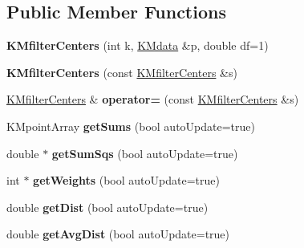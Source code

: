 \subsection*{Public Member Functions}
\begin{DoxyCompactItemize}
\item 
\hypertarget{class_k_mfilter_centers_af4430cb3cbc82ee0c08f837748f59bdb}{
{\bfseries KMfilterCenters} (int k, \hyperlink{class_k_mdata}{KMdata} \&p, double df=1)}
\label{class_k_mfilter_centers_af4430cb3cbc82ee0c08f837748f59bdb}

\item 
\hypertarget{class_k_mfilter_centers_a2c7cbf025c94dcda95983c624529d5c6}{
{\bfseries KMfilterCenters} (const \hyperlink{class_k_mfilter_centers}{KMfilterCenters} \&s)}
\label{class_k_mfilter_centers_a2c7cbf025c94dcda95983c624529d5c6}

\item 
\hypertarget{class_k_mfilter_centers_ab1ff450cd1ae6c4f2c768ed87c71999e}{
\hyperlink{class_k_mfilter_centers}{KMfilterCenters} \& {\bfseries operator=} (const \hyperlink{class_k_mfilter_centers}{KMfilterCenters} \&s)}
\label{class_k_mfilter_centers_ab1ff450cd1ae6c4f2c768ed87c71999e}

\item 
\hypertarget{class_k_mfilter_centers_a9224a2085d9494ec99f889de917bd5c1}{
KMpointArray {\bfseries getSums} (bool autoUpdate=true)}
\label{class_k_mfilter_centers_a9224a2085d9494ec99f889de917bd5c1}

\item 
\hypertarget{class_k_mfilter_centers_aef720474a3d4785ed054665038d608f8}{
double $\ast$ {\bfseries getSumSqs} (bool autoUpdate=true)}
\label{class_k_mfilter_centers_aef720474a3d4785ed054665038d608f8}

\item 
\hypertarget{class_k_mfilter_centers_aa69c3f0e244e3eb45a4235bf6bf0900a}{
int $\ast$ {\bfseries getWeights} (bool autoUpdate=true)}
\label{class_k_mfilter_centers_aa69c3f0e244e3eb45a4235bf6bf0900a}

\item 
\hypertarget{class_k_mfilter_centers_a745b4c9d2dc32cf0bdda0fdfc6e30e13}{
double {\bfseries getDist} (bool autoUpdate=true)}
\label{class_k_mfilter_centers_a745b4c9d2dc32cf0bdda0fdfc6e30e13}

\item 
\hypertarget{class_k_mfilter_centers_aea19371fe543a7a0941be8d304d3d359}{
double {\bfseries getAvgDist} (bool autoUpdate=true)}
\label{class_k_mfilter_centers_aea19371fe543a7a0941be8d304d3d359}


\end{DoxyCompactItemize}
